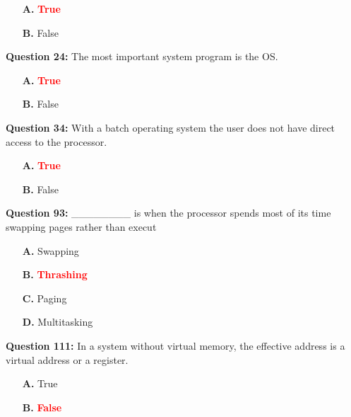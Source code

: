\documentclass[12pt,a4paper]{article}
\begin{document}
\begin{itemize}
    \item[\textbf{A.}] \textcolor{red}{\textbf{True}}
    \item[\textbf{B.}] False
\end{itemize}

\vspace{0.5cm}

\textbf{Question 24:} The most important system program is the OS.

\begin{itemize}
    \item[\textbf{A.}] \textcolor{red}{\textbf{True}}
    \item[\textbf{B.}] False
\end{itemize}

\vspace{0.5cm}

\textbf{Question 34:} With a batch operating system the user does not have direct access to the processor.

\begin{itemize}
    \item[\textbf{A.}] \textcolor{red}{\textbf{True}}
    \item[\textbf{B.}] False
\end{itemize}

\vspace{0.5cm}

\textbf{Question 93:} ________ is when the processor spends most of its time swapping pages rather than execut

\begin{itemize}
    \item[\textbf{A.}] Swapping
    \item[\textbf{B.}] \textcolor{red}{\textbf{Thrashing}}
    \item[\textbf{C.}] Paging
    \item[\textbf{D.}] Multitasking
\end{itemize}

\vspace{0.5cm}

\textbf{Question 111:} In a system without virtual memory, the effective address is a virtual address or a register.

\begin{itemize}
    \item[\textbf{A.}] True
    \item[\textbf{B.}] \textcolor{red}{\textbf{False}}
\end{itemize}
\end{document}
